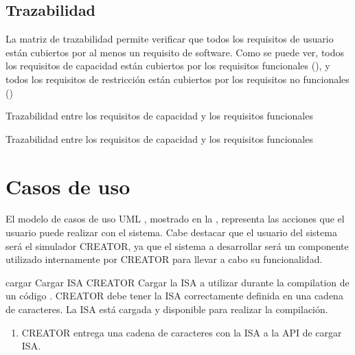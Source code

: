 \FloatBarrier


\subsection{Trazabilidad}\label{subsec:trazability}

La matriz de trazabilidad permite verificar que todos los requisitos de usuario
están cubiertos por al menos un requisito de software. Como se puede ver, todos
los requisitos de capacidad están cubiertos por los requisitos funcionales
(), y todos los requisitos de restricción están
cubiertos por los requisitos no funcionales ()

    {Trazabilidad entre los requisitos de capacidad y los requisitos funcionales}

    {Trazabilidad entre los requisitos de capacidad y los requisitos funcionales}

\FloatBarrier

\section{Casos de uso}\label{sec:usecases}

El modelo de casos de uso UML \parencite{UMLSpec}, mostrado en la
, representa las acciones que el usuario puede realizar con
el sistema. Cabe destacar que el usuario del sistema será el simulador CREATOR,
ya que el sistema a desarrollar será un componente utilizado internamente por
CREATOR para llevar a cabo su funcionalidad.


\printuctemplate

\begin{useCase}{cargar}
    {Cargar \gls{ISA}} %
    {CREATOR} %
    {Cargar la \gls{ISA} a utilizar durante la \gls{compilation} de un código .} %
    {CREATOR debe tener la \gls{ISA} correctamente definida en una cadena de caracteres.} %
    {La \gls{ISA} está cargada y disponible para realizar la compilación.} %
    \begin{enumerate}[leftmargin=*, topsep=0pt, noitemsep]
        \item CREATOR entrega una cadena de caracteres con la
        \gls{ISA} a la \gls{API} de cargar \gls{ISA}.
    \end{enumerate}
\end{useCase}

